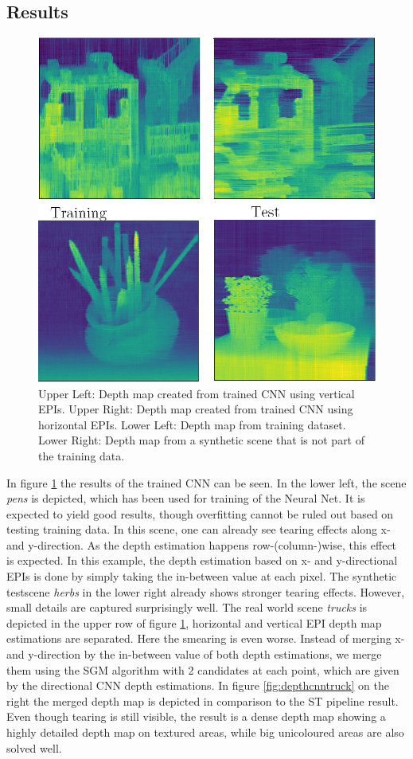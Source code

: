 \documentclass  [
  paper    = a4,
  BCOR     = 10mm,
  twoside,
  fontsize = 12pt,
  fleqn,
  toc      = bibnumbered,
  toc      = listofnumbered,
  numbers  = noendperiod,
  headings = normal,
  listof   = leveldown,
  version  = 3.03
]                                       {scrreprt}
\begin{document}
\begin{appendix}
\section*{Results}
\begin{figure}[h!]
	\centering
	\includegraphics[width=0.7\linewidth]{images/CNN_EPi_images}
	\caption[CNN results]{Upper Left: Depth map created from trained CNN using vertical EPIs. Upper Right: Depth map created from trained CNN using horizontal EPIs. Lower Left: Depth map from training dataset. Lower Right: Depth map from a synthetic scene that is not part of the training data.}
	\label{fig:cnnepiimages}
\end{figure}
In figure \ref{fig:cnnepiimages} the results of the trained CNN can be seen. In the lower left, the scene \textit{pens} is depicted, which has been used for training of the Neural Net. It is expected to yield good results, though overfitting cannot be ruled out based on testing training data. In this scene, one can already see tearing effects along x- and y-direction. As the depth estimation happens row-(column-)wise, this effect is expected. In this example, the depth estimation based on x- and y-directional EPIs is done by simply taking the in-between value at each pixel. The synthetic testscene \textit{herbs} in the lower right already shows stronger tearing effects. However, small details are captured surprisingly well. The real world scene \textit{trucks} is depicted in the upper row of figure \ref{fig:cnnepiimages}, horizontal and vertical EPI depth map estimations are separated. Here the smearing is even worse. Instead of merging x- and y-direction by the in-between value of both depth estimations, we merge them using the SGM algorithm with 2 candidates at each point, which are given by the directional CNN depth estimations. In figure \ref{fig:depthcnntruck} on the right the merged depth map is depicted in comparison to the ST pipeline result. Even though tearing is still visible, the result is a dense depth map showing a highly detailed depth map on textured areas, while big unicoloured areas are also solved well.\\

\end{appendix}
\end{document}
